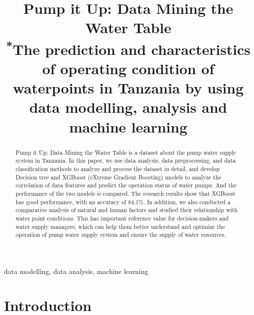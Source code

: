 \documentclass[conference]{IEEEtran}
\begin{document}
\title{Pump it Up: Data Mining the Water Table\\
{\footnotesize \textsuperscript{*}The prediction and characteristics of operating condition of waterpoints in Tanzania by using data modelling, analysis and machine learning}
}

\author{
\and
{}
}

\maketitle

\begin{abstract}

    Pump it Up: Data Mining the Water Table is a dataset about the pump water supply system in Tanzania. In this paper, we use data analysis, data preprocessing, and data classification methods to analyze and process the dataset in detail, and develop Decision tree and XGBoost (eXtreme Gradient Boosting) models to analyze the correlation of data features and predict the operation status of water pumps. And the performance of the two models is compared. The research results show that XGBoost has good performance, with an accuracy of 84.1\%. In addition, we also conducted a comparative analysis of natural and human factors and studied their relationship with water point conditions. This has important reference value for decision-makers and water supply managers, which can help them better understand and optimize the operation of pump water supply system and ensure the supply of water resources.
    

\end{abstract}

\begin{IEEEkeywords}
data modelling, data analysis, machine learning
\end{IEEEkeywords}

\section{Introduction}
\end{document}
